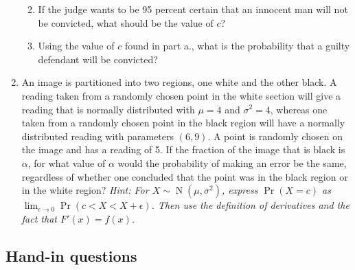 \documentclass[
]{book}
\DeclareMathOperator{\N}{N}
\theoremstyle{definition}
\theoremstyle{definition}
\theoremstyle{definition}
\theoremstyle{definition}
\theoremstyle{remark}
\begin{document}
\begin{enumerate}
  \begin{enumerate}
  \def\labelenumii{(\alph{enumii})}
  \item
    If the judge wants to be 95 percent certain that an innocent man will not be convicted, what should be the value of \(c\)?
  \item
    Using the value of \(c\) found in part a., what is the probability that a guilty defendant will be convicted?
  \end{enumerate}
\item
  An image is partitioned into two regions, one white and the other black. A reading taken from a randomly chosen point in the white section will give a reading that is normally distributed with \(\mu=4\) and \(\sigma^2=4\), whereas one taken from a randomly chosen point in the black region will have a normally distributed reading with parameters \((6, 9)\). A point is randomly chosen on the image and has a reading of 5. If the fraction of the image that is black is \(\alpha\), for what value of \(\alpha\) would the probability of making an error be the same, regardless of whether one concluded that the point was in the black region or in the white region?
  \emph{Hint: For \(X\sim\N(\mu,\sigma^2)\), express \(\Pr(X=c)\) as \(\lim_{\epsilon\to 0} \Pr(c<X<X+\epsilon)\). Then use the definition of derivatives and the fact that \(F'(x)=f(x)\).}
\end{enumerate}

\hypertarget{hand-in-questions-1}{%
\subsection*{Hand-in questions}\label{hand-in-questions-1}}
\end{document}
